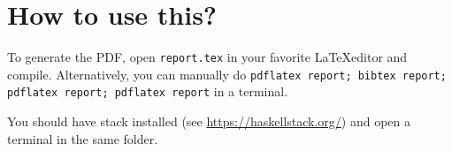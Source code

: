 
\section{How to use this?}

To generate the PDF, open \texttt{report.tex} in your favorite \LaTeX editor and compile.
Alternatively, you can manually do
\texttt{pdflatex report; bibtex report; pdflatex report; pdflatex report} in a terminal.

You should have stack installed (see \url{https://haskellstack.org/}) and
open a terminal in the same folder.


